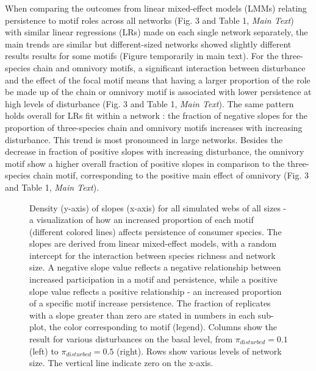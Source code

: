 \documentclass[12pt]{article}
\begin{document}
\begin{spacing}{2.0}
    When comparing the outcomes from linear mixed-effect models (LMMs) relating persistence to motif roles across all networks (Fig. 3 and Table 1, \emph{Main Text}) with similar linear regressions (LRs) made on each single network separately, the main trends are similar but different-sized networks showed slightly different results results for some motifs (Figure temporarily in main text).%
    For the three-species chain and omnivory motifs, a significant interaction between disturbance and the effect of the focal motif means that having a larger proportion of the role be made up of the chain or omnivory motif is associated with lower persistence at high levels of disturbance (Fig. 3 and Table 1, \emph{Main Text}). 
    The same pattern holds overall for LRs fit within a network  %
    : the fraction of negative slopes for the proportion of three-species chain and omnivory motifs increases with increasing disturbance. 
    This trend is most pronounced in large networks.%
    Besides the decrease in fraction of positive slopes with increasing disturbance, the omnivory motif show a higher overall fraction of positive slopes in comparison to the three-species chain motif, corresponding to the positive main effect of omnivory (Fig. 3 and Table 1, \emph{Main Text}). 


    \begin{figure}[h!]
         \centering
        \caption{Density (y-axis) of slopes (x-axis) for all simulated webs of all sizes - a visualization of how an increased proportion of each motif (different colored lines) affects persistence of consumer species. The slopes are derived from linear mixed-effect models, with a random intercept for the interaction between species richness and network size. A negative slope value reflects a negative relationship between increased participation in a motif and persistence, while a positive slope value reflects a positive relationship - an increased proportion of a specific motif increase persistence. The fraction of replicates with a slope greater than zero are stated in numbers in each sub-plot, the color corresponding to motif (legend). Columns show the result for various disturbances on the basal level, from $\pi_{disturbed} = 0.1$ (left) to $\pi_{disturbed} = 0.5$ (right). Rows show various levels of network size. The vertical line indicate zero on the x-axis.}
        \label{fig:density_prop_S}
    \end{figure}
    

\end{spacing}
\end{document}
